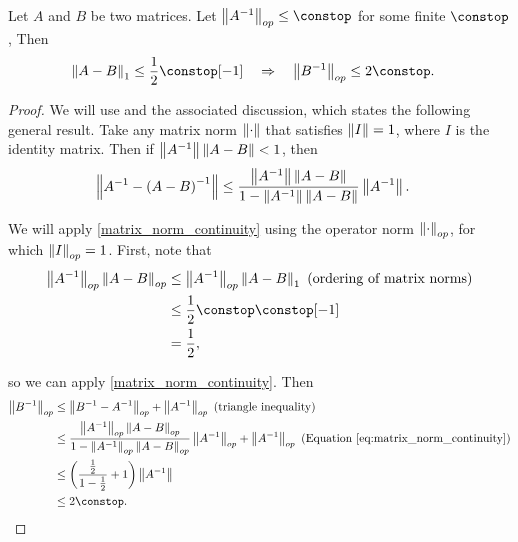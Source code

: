 \begin{prop}
Let $A$ and $B$ be two
matrices. Let $\norm{A^{-1}}_{op}\le\constop$ for some finite $\constop$,
Then
\begin{align*}
\norm{A-B}_{1}\le\frac{1}{2}\constop[-1] & \quad\Rightarrow\quad\norm{B^{-1}}_{op}\le2\constop.
\end{align*}
\end{prop}
%
\begin{proof}
We will use \citet[Theorem 5.20]{schott:2016:matrix} and the associated
discussion, which states the following general result. Take any matrix
norm $\left\Vert \cdot\right\Vert$ that satisfies $\left\Vert I\right\Vert=1$, where $I$ is the
identity matrix. Then if $\left\Vert A^{-1}\right\Vert\left\Vert A-B\right\Vert<1$, then
\begin{align}
\left\Vert A^{-1}-\left(A-B\right)^{-1}\right\Vert & \le\frac{\left\Vert A^{-1}\right\Vert\left\Vert A-B\right\Vert}{1-\left\Vert A^{-1}\right\Vert\left\Vert A-B\right\Vert}\left\Vert A^{-1}\right\Vert.\label{eq:matrix_norm_continuity}
\end{align}

We will apply \eqref{matrix_norm_continuity} using the operator norm
$\left\Vert \cdot\right\Vert_{op}$, for which $\left\Vert I\right\Vert_{op}=1$. First, note that
\begin{align*}
\norm{A^{-1}}_{op}\norm{A-B}_{op} & \le\norm{A^{-1}}_{op}\norm{A-B}_{1}\textrm{ (ordering of matrix norms)}\\
 & \le\frac{1}{2}\constop\constop[-1]\\
 & =\frac{1}{2},
\end{align*}

so we can apply \eqref{matrix_norm_continuity}. Then
\begin{align*}
\norm{B^{-1}}_{op}
 & \le \norm{B^{-1}-A^{-1}}_{op}+\norm{A^{-1}}_{op}\textrm{ (triangle inequality)}\\
 & \le\frac{\norm{A^{-1}}_{op}\norm{A-B}_{op}}{1-\norm{A^{-1}}_{op}\norm{A-B}_{op}}\norm{A^{-1}}_{op}+\norm{A^{-1}}_{op}\textrm{ (Equation \ref{eq:matrix_norm_continuity})}\\
 & \le\left(\frac{\frac{1}{2}}{1-\frac{1}{2}}+1\right)\norm{A^{-1}}\\
 & \le2\constop.
\end{align*}
\end{proof}





